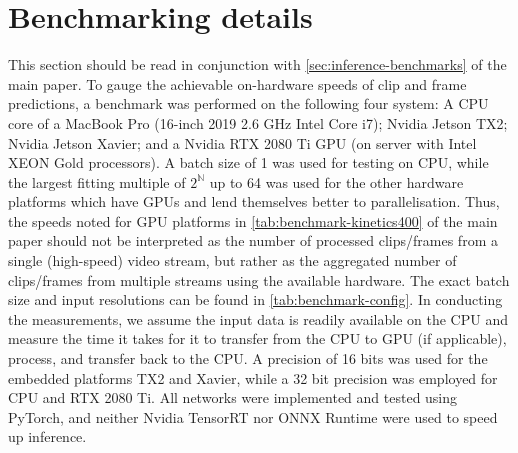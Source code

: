 \section{Benchmarking details} \label{apx:benchmark-details}
This section should be read in conjunction with \cref{sec:inference-benchmarks} of the main paper.
To gauge the achievable on-hardware speeds of clip and frame predictions, a benchmark was performed on the following four system:
A CPU core of a MacBook Pro (16-inch 2019 2.6 GHz Intel Core i7); 
Nvidia Jetson TX2;
Nvidia Jetson Xavier;
and a Nvidia RTX 2080 Ti GPU (on server with Intel XEON Gold processors).
%
A batch size of 1 was used for testing on CPU, while the largest fitting multiple of $2^\mathbb{N}$ up to 64 was used for the other hardware platforms which have GPUs and lend themselves better to parallelisation. 
Thus, the speeds noted for GPU platforms in \cref{tab:benchmark-kinetics400} of the main paper should not be interpreted as the number of processed clips/frames from a single (high-speed) video stream, but rather as the aggregated number of clips/frames from multiple streams using the available hardware.
The exact batch size and input resolutions can be found in \cref{tab:benchmark-config}. 
In conducting the measurements, we assume the input data is readily available on the CPU and measure the time it takes for it to transfer from the CPU to GPU (if applicable), process, and transfer back to the CPU.
A precision of 16 bits was used for the embedded platforms TX2 and Xavier, while a 32 bit precision was employed for CPU and RTX 2080 Ti. 
All networks were implemented and tested using PyTorch, and neither Nvidia TensorRT nor ONNX Runtime were used to speed up inference.


